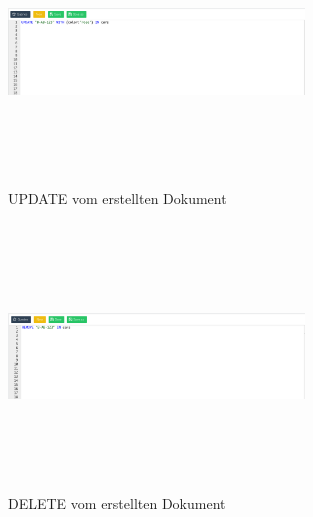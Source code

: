 \begin{figure}[htbp] 
  	\centering
     \includegraphics[width=0.7\textwidth, height=200pt, draft]{./images/update.png}
 	\caption{UPDATE vom erstellten Dokument}
  \label{fig:DataSchema}
\end{figure}
\begin{figure}[htbp] 
  	\centering
     \includegraphics[width=0.7\textwidth, height=200pt, draft]{./images/delete.png}
 	\caption{DELETE vom erstellten Dokument}
  \label{fig:DataSchema}
\end{figure}